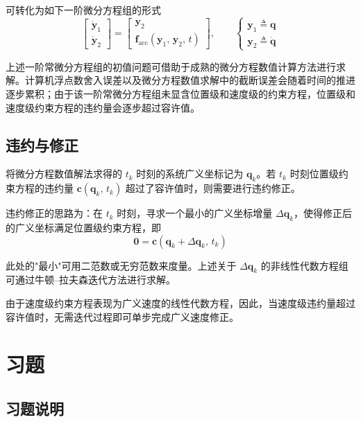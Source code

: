 可转化为如下一阶微分方程组的形式
\begin{equation}\label{eq:3.first_order}
\begin{bmatrix} \dot{\boldsymbol{y}}_1 \\[4pt] \dot{\boldsymbol{y}}_2 \end{bmatrix} = \begin{bmatrix} \boldsymbol{y}_2 \\[4pt] \boldsymbol{f}_{\mathrm{acc}}(\boldsymbol{y}_1,\, \boldsymbol{y}_2,\, t) \end{bmatrix}, \qquad
\begin{cases} \boldsymbol{y}_1 \triangleq \boldsymbol{q} \\ \boldsymbol{y}_2 \triangleq \dot{\boldsymbol{q}} \end{cases}
\end{equation}

上述一阶常微分方程组的初值问题可借助于成熟的微分方程数值计算方法进行求解。计算机浮点数舍入误差以及微分方程数值求解中的截断误差会随着时间的推进逐步累积；由于该一阶常微分方程组未显含位置级和速度级的约束方程，位置级和速度级约束方程的违约量会逐步超过容许值。


\subsection{违约与修正}

将微分方程数值解法求得的 $t_k$ 时刻的系统广义坐标记为 $\boldsymbol{q}_k$。若 $t_k$ 时刻位置级约束方程的违约量 $\boldsymbol{c}(\boldsymbol{q}_k,\, t_k)$ 超过了容许值时，则需要进行违约修正。

违约修正的思路为：在 $t_k$ 时刻，寻求一个最小的广义坐标增量 $\Delta\boldsymbol{q}_k$，使得修正后的广义坐标满足位置级约束方程，即
\begin{equation}
\boldsymbol{0} = \boldsymbol{c}(\boldsymbol{q}_k + \Delta\boldsymbol{q}_k,\, t_k)
\end{equation}

此处的"最小"可用二范数或无穷范数来度量。上述关于 $\Delta\boldsymbol{q}_k$ 的非线性代数方程组可通过牛顿--拉夫森迭代方法进行求解。

由于速度级约束方程表现为广义速度的线性代数方程，因此，当速度级违约量超过容许值时，无需迭代过程即可单步完成广义速度修正。


\section*{习题}

\subsection*{习题说明}

